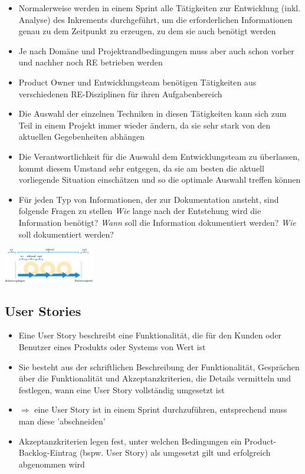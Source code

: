 \documentclass{report}
\newenvironment{Figure}
	{\par\medskip\noindent\minipage{\linewidth}}
	{\endminipage\par\medskip}
\theoremstyle{definition}
\theoremstyle{example}
\begin{document}
\begin{itemize}
   \item Normalerweise werden in einem Sprint alle Tätigkeiten zur Entwicklung (inkl. Analyse) des Inkrements durchgeführt, um die erforderlichen Informationen genau zu dem Zeitpunkt zu erzeugen, zu dem sie auch benötigt werden
   \item Je nach Domäne und Projektrandbedingungen muss aber auch schon vorher und nachher noch RE betrieben werden
   \item Product Owner und Entwicklungsteam benötigen Tätigkeiten aus verschiedenen RE-Disziplinen für ihren Aufgabenbereich
   \item Die Auswahl der einzelnen Techniken in diesen Tätigkeiten kann sich zum Teil in einem Projekt immer wieder ändern, da sie sehr stark von den aktuellen Gegebenheiten abhängen
   \item Die Verantwortlichkeit für die Auswahl dem Entwicklungsteam zu überlassen, kommt diesem Umstand sehr entgegen, da sie am besten die aktuell vorliegende Situation einschätzen und so die optimale Auswahl treffen können
   \item Für jeden Typ von Informationen, der zur Dokumentation ansteht, sind folgende Fragen zu stellen
   \subitem \textit{Wie} lange nach der Entstehung wird die Information benötigt?
   \subitem \textit{Wann} soll die Information dokumentiert werden?
   \subitem \textit{Wie} soll dokumentiert werden? 
\end{itemize}

\begin{Figure}
   \centering
    \includegraphics[width=150px]{img/ScrumOptionen.png}
        \label{fig:Integrations-Optionen von RE in Scrum}
\end{Figure}

\subsection{User Stories}
\begin{itemize}
   \item Eine User Story beschreibt eine Funktionalität, die für den Kunden oder Benutzer eines Produkts oder Systems von Wert ist
   \item Sie besteht aus der schriftlichen Beschreibung der Funktionalität, Gesprächen über die Funktionalität und Akzeptanzkriterien, die Details vermitteln und festlegen, wann eine User Story vollständig umgesetzt ist
   \item $\Rightarrow$ eine User Story ist in einem Sprint durchzuführen, entsprechend muss man diese 'abschneiden'
   \item Akzeptanzkriterien legen fest, unter welchen Bedingungen ein Product-Backlog-Eintrag (bspw. User Story) als umgesetzt gilt und erfolgreich abgenommen wird
\end{itemize}
\end{document}
